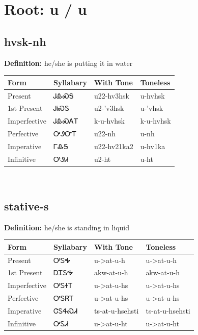 \documentclass{article}%
\begin{document}
%
\normalsize%
\section*{Root: u / u}%
\subsection*{hvsk-nh}%
\textbf{Definition: }%
he/she is putting it in water%
\\[0.5em]%
\begin{tabular}{|l|l|l|l|}%
\hline%
\textbf{Form}&\textbf{Syllabary}&\textbf{With Tone}&\textbf{Toneless}\\%
\hline%
Present&ᎫᎲᏍᎦ&u22{-}hv3hsk&u{-}hvhsk\\%
1st Present&ᎫᎥᏍᎦ&u2{-}'v3hsk&u{-}'vhsk\\%
Imperfective&ᎫᎲᏍᎪᎢ&k{-}u{-}hvhsk&k{-}u{-}hvhsk\\%
Perfective&ᎤᏭᏅᎢ&u22{-}nh&u{-}nh\\%
Imperative&ᎱᎲᎦ&u22{-}hv21ka2&u{-}hv1ka\\%
Infinitive&ᎤᏭᏗ&u2{-}ht&u{-}ht\\%
\hline%
\end{tabular}%
\\[1em]%
\subsection*{stative-s}%
\textbf{Definition: }%
he/she is standing in liquid%
\\[0.5em]%
\begin{tabular}{|l|l|l|l|}%
\hline%
\textbf{Form}&\textbf{Syllabary}&\textbf{With Tone}&\textbf{Toneless}\\%
\hline%
Present&ᎤᏚᎭ&u{-}>at{-}u{-}h&u{-}>at{-}u{-}h\\%
1st Present&ᎠᏆᏚᎭ&akw{-}at{-}u{-}h&akw{-}at{-}u{-}h\\%
Imperfective&ᎤᏚᏐᎢ&u{-}>at{-}u{-}hs&u{-}>at{-}u{-}hs\\%
Perfective&ᎤᏚᏒᎢ&u{-}>at{-}u{-}hs&u{-}>at{-}u{-}hs\\%
Imperative&ᏣᏚᏎᏍᏗ&ts{-}at{-}u{-}hsehsti&ts{-}at{-}u{-}hsehsti\\%
Infinitive&ᎤᏚᏗ&u{-}>at{-}u{-}ht&u{-}>at{-}u{-}ht\\%
\hline%
\end{tabular}%
\\[1em]%
\end{document}
